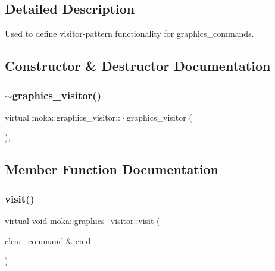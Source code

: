 \subsection{Detailed Description}
Used to define visitor-\/pattern functionality for graphics\+\_\+commands. 

\subsection{Constructor \& Destructor Documentation}
\mbox{\label{classmoka_1_1graphics__visitor_abb4149b5b2b3427d717f502ac6f0d62a}} 
\subsubsection{\texorpdfstring{$\sim$graphics\_visitor()}{~graphics\_visitor()}}
{\footnotesize\ttfamily virtual moka\+::graphics\+\_\+visitor\+::$\sim$graphics\+\_\+visitor (\begin{DoxyParamCaption}{ }\end{DoxyParamCaption})\hspace{0.3cm}{\ttfamily [virtual]}, {\ttfamily [default]}}



\subsection{Member Function Documentation}
\mbox{\label{classmoka_1_1graphics__visitor_a23fe107787a01cf0ceb2e20d339d4493}} 
\subsubsection{\texorpdfstring{visit()}{visit()}\hspace{0.1cm}{\footnotesize\ttfamily [1/10]}}
{\footnotesize\ttfamily virtual void moka\+::graphics\+\_\+visitor\+::visit (\begin{DoxyParamCaption}\item[{\mbox{\hyperlink{classmoka_1_1clear__command}{clear\+\_\+command}} \&}]{cmd }\end{DoxyParamCaption})\hspace{0.3cm}{\ttfamily [pure virtual]}}

